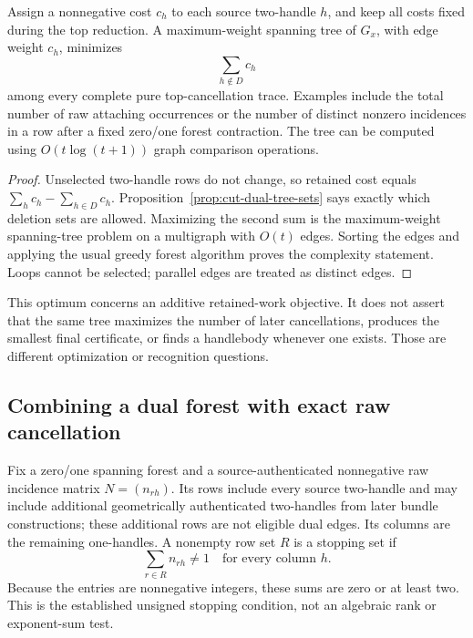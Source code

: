 \begin{theorem}
\label{thm:cut-dual-weighted}
Assign a nonnegative cost $c_h$ to each source two-handle $h$, and keep
all costs fixed during the top reduction.  A maximum-weight spanning
tree of $G_x$, with edge weight $c_h$, minimizes
\[
  \sum_{h\notin D}c_h
\]
among every complete pure top-cancellation trace.  Examples include the
total number of raw attaching occurrences or the number of distinct
nonzero incidences in a row after a fixed zero/one forest contraction.
The tree can be computed using $O(t\log(t+1))$ graph comparison operations.
\end{theorem}

\begin{proof}
Unselected two-handle rows do not change, so retained cost equals
$\sum_h c_h-\sum_{h\in D}c_h$.  Proposition~\ref{prop:cut-dual-tree-sets}
says exactly which deletion sets are allowed.  Maximizing the second
sum is the maximum-weight spanning-tree problem on a multigraph with
$O(t)$ edges.  Sorting the edges and applying the usual greedy forest
algorithm proves the complexity statement.  Loops cannot be selected;
parallel edges are treated as distinct edges.
\end{proof}

This optimum concerns an additive retained-work objective.  It does not
assert that the same tree maximizes the number of later cancellations,
produces the smallest final certificate, or finds a handlebody whenever
one exists.  Those are different optimization or recognition questions.

\subsection{Combining a dual forest with exact raw cancellation}

Fix a zero/one spanning forest and a source-authenticated nonnegative
raw incidence matrix $N=(n_{rh})$.  Its rows include every source
two-handle and may include additional geometrically authenticated
two-handles from later bundle constructions; these additional rows are
not eligible dual edges.  Its columns are the remaining one-handles.
A nonempty row set $R$ is a stopping set if
\[
  \sum_{r\in R} n_{rh}\ne 1\quad\text{for every column }h.
\]
Because the entries are nonnegative integers, these sums are zero or at
least two.  This is the established unsigned stopping condition, not
an algebraic rank or exponent-sum test.

